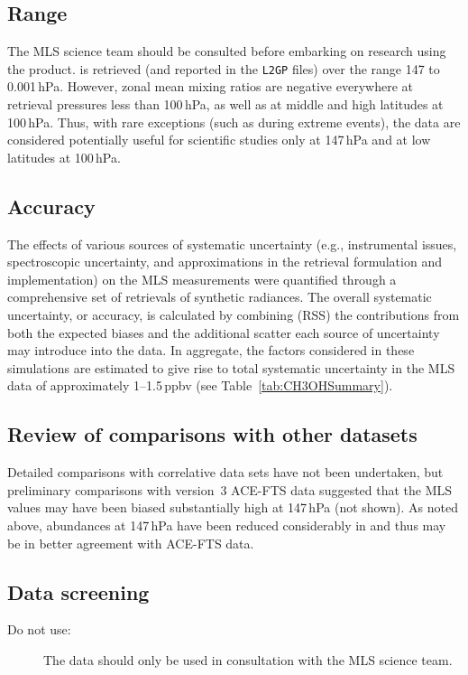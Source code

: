 \subsection{Range}

The MLS science team should be consulted before embarking on research using the  product.  is retrieved (and reported in the \texttt{L2GP} files) over the range 147 to 0.001\,hPa. However, zonal mean mixing ratios are negative everywhere at retrieval pressures less than 100\,hPa, as well as at middle and high latitudes at 100\,hPa. Thus, with rare exceptions (such as during extreme events), the \thisv {} data are considered potentially useful for scientific studies only at 147\,hPa and at low latitudes at 100\,hPa.

\subsection{Accuracy}
\label{sec:ch3ohacc}

The effects of various sources of systematic uncertainty (e.g., instrumental issues, spectroscopic uncertainty, and approximations in the retrieval formulation and implementation) on the MLS \thisv {} measurements were quantified through a comprehensive set of retrievals of synthetic radiances. The overall systematic uncertainty, or accuracy, is calculated by combining (RSS) the contributions from both the expected biases and the additional scatter each source of uncertainty may introduce into the data. In aggregate, the factors considered in these simulations are estimated to give rise to total systematic uncertainty in the MLS \thisv {} data of approximately 1--1.5\,ppbv (see Table~\ref{tab:CH3OHSummary}).

\subsection{Review of comparisons with other datasets}

Detailed comparisons with correlative data sets have not been undertaken, but preliminary comparisons with version~3 \mbox{ACE-FTS} data suggested that the \viv MLS values may have been biased substantially high at 147\,hPa (not shown). As noted above,  abundances at 147\,hPa have been reduced considerably in \thisv and thus may be in better agreement with \mbox{ACE-FTS} data.

\begin{nofloatpages}
\subsection{Data screening}
\label{sec:CH3OHScreening}
\begin{description}
  \item[Do not use:] The \thisv {} data should only be used in consultation with the MLS science team.
\end{description}
\end{nofloatpages}

